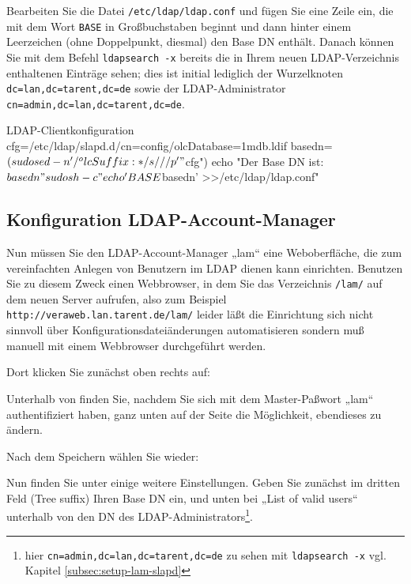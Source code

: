 Bearbeiten Sie die Datei \texttt{/etc/ldap/ldap.conf} und fügen Sie eine
Zeile ein, die mit dem Wort \texttt{BASE} in Großbuchstaben beginnt und dann
hinter einem Leerzeichen (ohne Doppelpunkt, diesmal) den Base DN enthält.
Danach können Sie mit dem Befehl \texttt{ldapsearch -x} bereits die in
Ihrem neuen LDAP-Verzeichnis enthaltenen Einträge sehen; dies ist initial
lediglich der Wurzelknoten \texttt{dc=lan,dc=tarent,dc=de} sowie der
LDAP-Administrator \texttt{cn=admin,dc=lan,dc=tarent,dc=de}.

\begin{minipage}{\textwidth}
\begin{lstdump}{LDAP-Clientkonfiguration}
cfg=/etc/ldap/slapd.d/cn=config/olcDatabase={1}mdb.ldif
basedn=$(sudo sed -n '/^olcSuffix: */s///p' "$cfg")
echo "Der Base DN ist: $basedn"
sudo sh -c "echo 'BASE $basedn' >>/etc/ldap/ldap.conf"
\end{lstdump}
\end{minipage}

\subsection{Konfiguration LDAP-Account-Manager}\label{subsec:setup-lam-cfg}

Nun müssen Sie den LDAP-Account-Manager „lam“ \dash eine Weboberfläche,
die zum vereinfachten Anlegen von Benutzern im LDAP dienen kann \dash
einrichten. Benutzen Sie zu diesem Zweck einen Webbrowser, in dem Sie
das Verzeichnis \texttt{/lam/} auf dem neuen Server aufrufen, also zum
Beispiel \texttt{http://veraweb.lan.tarent.de/lam/} \dash leider läßt
die Einrichtung sich nicht sinnvoll über Konfigurationsdateiänderungen
automatisieren sondern muß manuell mit einem Webbrowser durchgeführt
werden.

Dort klicken Sie zunächst oben rechts auf:

Unterhalb von  finden
Sie, nachdem Sie sich mit dem Master-Paßwort „lam“ authentifiziert
haben, ganz unten auf der Seite die Möglichkeit, ebendieses zu ändern.

Nach dem Speichern wählen Sie wieder:

Nun finden Sie unter 
einige weitere Einstellungen. Geben Sie zunächst im dritten Feld
(Tree suffix) Ihren Base DN ein, und unten bei „List of valid users“
unterhalb von  den DN
des LDAP-Administrators\Hair\footnote{hier
\texttt{cn=admin,dc=lan,dc=tarent,dc=de} \dash zu sehen mit
\texttt{ldapsearch -x} \dash vgl. Kapitel \ref{subsec:setup-lam-slapd}}.

